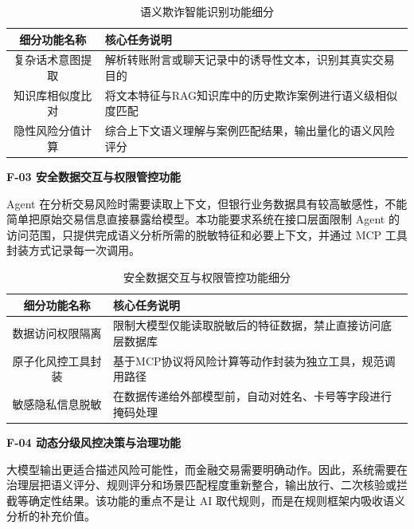 \documentclass{xduugthesis}
\begin{document}
\begin{table}[H]
    \centering
    \caption{语义欺诈智能识别功能细分}
    \label{tab:f02-sub}
    \begin{tabular}{|c|p{7cm}|}
        \hline
        细分功能名称 & 核心任务说明 \\
        \hline
        复杂话术意图提取 & 解析转账附言或聊天记录中的诱导性文本，识别其真实交易目的 \\
        \hline
        知识库相似度比对 & 将文本特征与RAG知识库中的历史欺诈案例进行语义级相似度匹配 \\
        \hline
        隐性风险分值计算 & 综合上下文语义理解与案例匹配结果，输出量化的语义风险评分 \\
        \hline
    \end{tabular}
\end{table}

\textbf{F-03 安全数据交互与权限管控功能}

Agent 在分析交易风险时需要读取上下文，但银行业务数据具有较高敏感性，不能简单把原始交易信息直接暴露给模型。本功能要求系统在接口层面限制 Agent 的访问范围，只提供完成语义分析所需的脱敏特征和必要上下文，并通过 MCP 工具封装方式记录每一次调用。

\begin{table}[H]
    \centering
    \caption{安全数据交互与权限管控功能细分}
    \label{tab:f03-sub}
    \begin{tabular}{|c|p{7cm}|}
        \hline
        细分功能名称 & 核心任务说明 \\
        \hline
        数据访问权限隔离 & 限制大模型仅能读取脱敏后的特征数据，禁止直接访问底层数据库 \\
        \hline
        原子化风控工具封装 & 基于MCP协议将风险计算等动作封装为独立工具，规范调用路径 \\
        \hline
        敏感隐私信息脱敏 & 在数据传递给外部模型前，自动对姓名、卡号等字段进行掩码处理 \\
        \hline
    \end{tabular}
\end{table}

\textbf{F-04 动态分级风控决策与治理功能}

大模型输出更适合描述风险可能性，而金融交易需要明确动作。因此，系统需要在治理层把语义评分、规则评分和场景匹配程度重新整合，输出放行、二次核验或拦截等确定性结果。该功能的重点不是让 AI 取代规则，而是在规则框架内吸收语义分析的补充价值。
\end{document}

